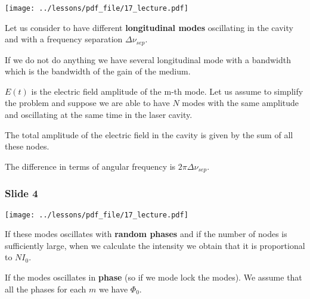 \documentclass[../main/main.tex]{subfiles}
\begin{document}
\begin{minipage}[]{0.5\linewidth}
\centering
\texttt{[image: ../lessons/pdf\_file/17\_lecture.pdf]}
\end{minipage}
\hspace{0.3cm}\vspace{0.3cm}
\begin{minipage}[c]{0.47\linewidth}

Let us consider to have different \textbf{longitudinal modes} oscillating in the cavity and with a frequency separation \( \Delta \nu _{sep} \).

If we do not do anything we have several longitudinal mode with a bandwidth which is the bandwidth of the gain of the medium.

\( E(t) \) is the electric field amplitude of the m-th mode. Let us assume to simplify the problem and suppose we are able to have \( N \) modes with the same amplitude and oscillating at the same time in the laser cavity.

The total amplitude of the electric field in the cavity is given by the sum of all these nodes.

The difference in terms of angular frequency is \( 2 \pi \Delta \nu _{sep} \).

\end{minipage}

\newpage

\subsubsection*{Slide 4}

\begin{minipage}[]{0.5\linewidth}
\centering
\texttt{[image: ../lessons/pdf\_file/17\_lecture.pdf]}
\end{minipage}
\hspace{0.3cm}\vspace{0.3cm}
\begin{minipage}[c]{0.47\linewidth}

If these modes oscillates with \textbf{random phases} and if the number of nodes is sufficiently large, when we calculate the intensity we obtain that it is proportional to \( N I_0 \).

If the modes oscillates in \textbf{phase} (so if we mode lock the modes). We assume that all the phases for each \( m \) we have \( \Phi _0 \).

\end{minipage}
\end{document}
